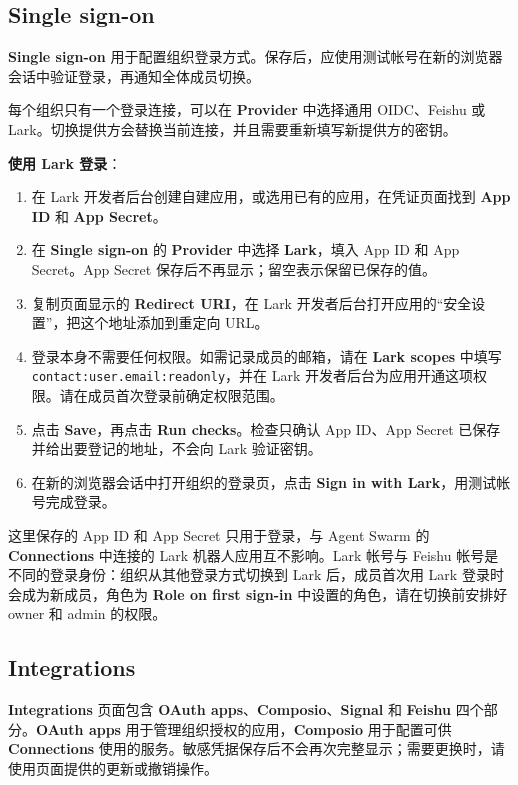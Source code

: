 \documentclass[UTF8,a4paper,11pt]{ctexart}
\begin{document}
\subsection{Single sign-on}

\textbf{Single sign-on} 用于配置组织登录方式。保存后，应使用测试帐号在新的浏览器会话中验证登录，再通知全体成员切换。

每个组织只有一个登录连接，可以在 \textbf{Provider} 中选择通用 OIDC、Feishu 或 Lark。切换提供方会替换当前连接，并且需要重新填写新提供方的密钥。

\textbf{使用 Lark 登录}：

\begin{enumerate}
  \item 在 Lark 开发者后台创建自建应用，或选用已有的应用，在凭证页面找到 \textbf{App ID} 和 \textbf{App Secret}。
  \item 在 \textbf{Single sign-on} 的 \textbf{Provider} 中选择 \textbf{Lark}，填入 App ID 和 App Secret。App Secret 保存后不再显示；留空表示保留已保存的值。
  \item 复制页面显示的 \textbf{Redirect URI}，在 Lark 开发者后台打开应用的“安全设置”，把这个地址添加到重定向 URL。
  \item 登录本身不需要任何权限。如需记录成员的邮箱，请在 \textbf{Lark scopes} 中填写 \texttt{contact:user.email:readonly}，并在 Lark 开发者后台为应用开通这项权限。请在成员首次登录前确定权限范围。
  \item 点击 \textbf{Save}，再点击 \textbf{Run checks}。检查只确认 App ID、App Secret 已保存并给出要登记的地址，不会向 Lark 验证密钥。
  \item 在新的浏览器会话中打开组织的登录页，点击 \textbf{Sign in with Lark}，用测试帐号完成登录。
\end{enumerate}

这里保存的 App ID 和 App Secret 只用于登录，与 Agent Swarm 的 \textbf{Connections} 中连接的 Lark 机器人应用互不影响。Lark 帐号与 Feishu 帐号是不同的登录身份：组织从其他登录方式切换到 Lark 后，成员首次用 Lark 登录时会成为新成员，角色为 \textbf{Role on first sign-in} 中设置的角色，请在切换前安排好 owner 和 admin 的权限。

\subsection{Integrations}

\textbf{Integrations} 页面包含 \textbf{OAuth apps}、\textbf{Composio}、\textbf{Signal} 和 \textbf{Feishu} 四个部分。\textbf{OAuth apps} 用于管理组织授权的应用，\textbf{Composio} 用于配置可供 \textbf{Connections} 使用的服务。敏感凭据保存后不会再次完整显示；需要更换时，请使用页面提供的更新或撤销操作。
\end{document}
